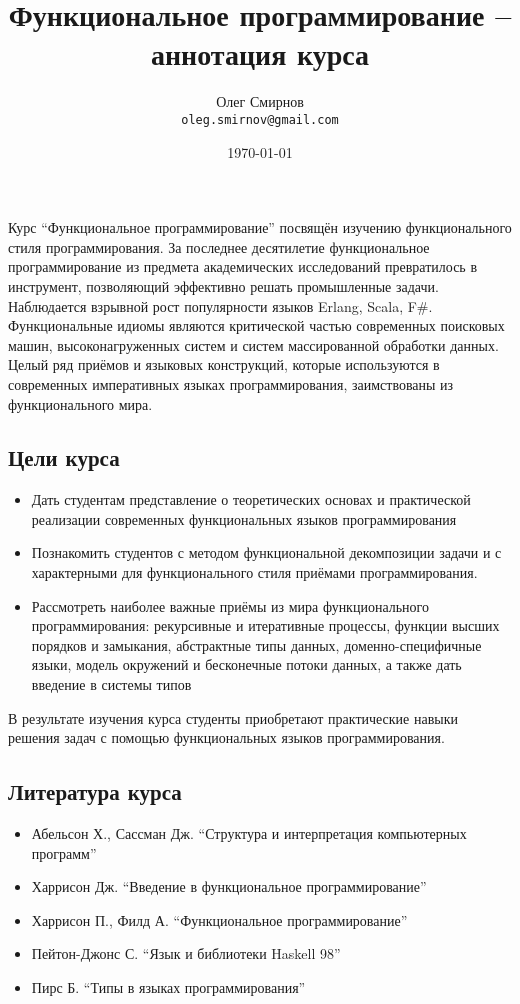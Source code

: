 \documentclass[a4paper,11pt]{article}
\author{Олег Смирнов \\
\texttt{oleg.smirnov@gmail.com}}
\date{\today}
\title{Функциональное программирование -- аннотация курса}
\begin{document}
\maketitle

Курс ``Функциональное программирование'' посвящён изучению функционального 
стиля программирования. За последнее десятилетие функциональное 
программирование из предмета академических исследований превратилось в
инструмент, позволяющий эффективно решать промышленные задачи. Наблюдается
взрывной рост популярности языков Erlang, Scala, F\#. Функциональные 
идиомы являются критической частью современных поисковых машин,
высоконагруженных систем и систем массированной обработки данных. Целый
ряд приёмов и языковых конструкций, которые используются в современных
императивных языках программирования, заимствованы из функционального мира.

\subsection*{Цели курса}
\begin{itemize}
\item Дать студентам представление о теоретических основах и практической
реализации современных функциональных языков программирования
\item Познакомить студентов с методом функциональной декомпозиции задачи
и с характерными для функционального стиля приёмами программирования.
\item Рассмотреть наиболее важные приёмы из мира функционального
программирования: рекурсивные и итеративные процессы, функции высших порядков
и замыкания, абстрактные типы данных, доменно-специфичные языки, модель
окружений и бесконечные потоки данных, а также дать введение в системы типов
\end{itemize}

В результате изучения курса студенты приобретают практические навыки
решения задач с помощью функциональных языков программирования.

\subsection*{Литература курса}
\begin{itemize}
\item Абельсон Х., Сассман Дж. ``Структура и интерпретация компьютерных программ''
\item Харрисон Дж. ``Введение в функциональное программирование''
\item Харрисон П., Филд А. ``Функциональное программирование''
\item Пейтон-Джонс С. ``Язык и библиотеки Haskell 98''
\item Пирс Б. ``Типы в языках программирования''
\end{itemize}
\end{document}

